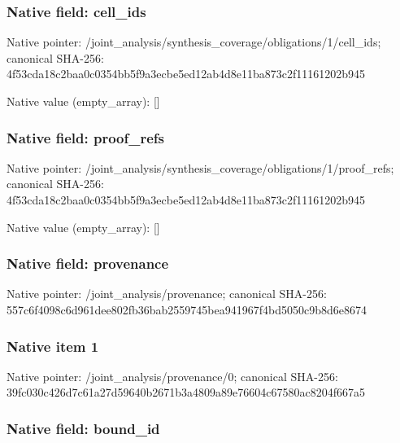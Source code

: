 \documentclass[10pt,a4paper]{article}
\begin{document}
\subsubsection{Native field: cell\_ids}


Native pointer: /joint\_analysis/synthesi\allowbreak{}s\_coverage/obligations/1\allowbreak{}/cell\_ids; canonical SHA-256: 4f53cda18c2baa0c0354bb5f\allowbreak{}9a3ecbe5ed12ab4d8e11ba87\allowbreak{}3c2f11161202b945



Native value (empty\_array): []



\subsubsection{Native field: proof\_refs}


Native pointer: /joint\_analysis/synthesi\allowbreak{}s\_coverage/obligations/1\allowbreak{}/proof\_refs; canonical SHA-256: 4f53cda18c2baa0c0354bb5f\allowbreak{}9a3ecbe5ed12ab4d8e11ba87\allowbreak{}3c2f11161202b945



Native value (empty\_array): []



\subsubsection{Native field: provenance}


Native pointer: /joint\_analysis/provenance; canonical SHA-256: 557c6f4098c6d961dee802fb\allowbreak{}36bab2559745bea941967f4b\allowbreak{}d5050c9b8d6e8674



\subsubsection{Native item 1}


Native pointer: /joint\_analysis/provenance/0; canonical SHA-256: 39fc030c426d7c61a27d5964\allowbreak{}0b2671b3a4809a89e76604c6\allowbreak{}7580ac8204f667a5



\subsubsection{Native field: bound\_id}
\end{document}
